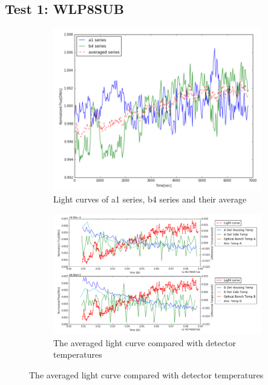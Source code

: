 \documentclass{aastex6}
\begin{document}
\subsection{Test 1: WLP8SUB} 
\begin{figure}[H]
    \centering
    \begin{subfigure}{1}
        \includegraphics[scale=0.4]{ts_test1}
        \caption{Light curves of a1 series, b4 series and their average}
    \end{subfigure}

    \begin{subfigure}{2}
        \includegraphics[scale=0.4]{temp_test1}
        \caption{The averaged light curve compared with detector temperatures}
    \end{subfigure}
   

\end{figure}
\end{document}
